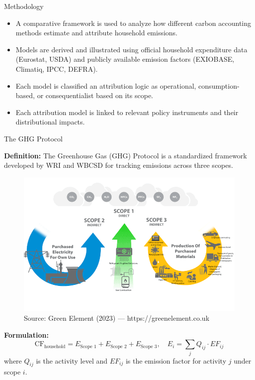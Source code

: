 \documentclass{beamer}
\begin{document}
\begin{frame}{Methodology}
\footnotesize
\begin{itemize}
\item A comparative framework is used to analyze how different carbon accounting methods estimate and attribute household emissions.
\item Models are derived and illustrated using official household expenditure data (Eurostat, USDA) and publicly available emission factors (EXIOBASE, Climatiq, IPCC, DEFRA).
\item Each model is classified an attribution logic as operational, consumption-based, or consequentialist based on its scope.
\item Each attribution model is linked to relevant policy instruments and their distributional impacts.
\end{itemize}
\end{frame}


\begin{frame}{The GHG Protocol}
\small
\vspace{-2.5em}

\footnotesize \textbf{Definition:}  
The Greenhouse Gas (GHG) Protocol is a standardized framework developed by WRI and WBCSD for tracking emissions across three scopes.
\vspace{-0.5em}
\begin{figure}[h]
  \centering
  \includegraphics[width=0.55\linewidth]{ghg scope.png}
  \caption*{\tiny Source: Green Element (2023) — https://greenelement.co.uk}
\end{figure}
\vspace{-1.0em}
\footnotesize \textbf{Formulation:}
\[
\text{CF}_{\text{household}} = E_{\text{Scope 1}} + E_{\text{Scope 2}} + E_{\text{Scope 3}}, \quad 
E_i = \sum_j Q_{ij} \cdot EF_{ij}
\]
{\footnotesize where $Q_{ij}$ is the activity level and $EF_{ij}$ is the emission factor for activity $j$ under scope $i$.}

\end{frame}
\end{document}
